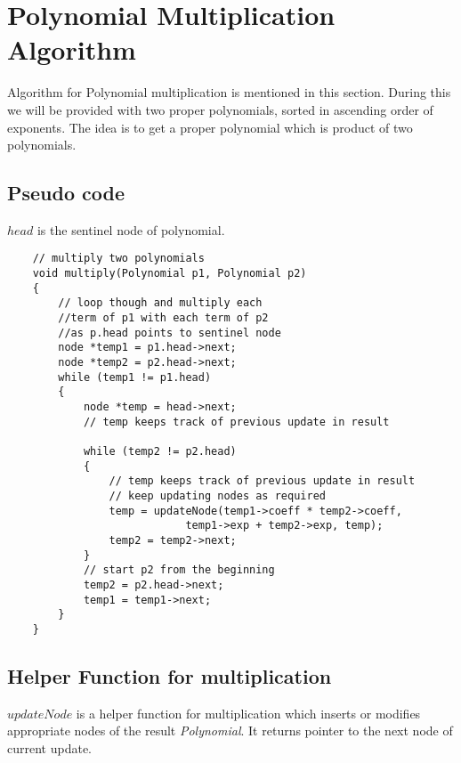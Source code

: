 \section{Polynomial Multiplication Algorithm}
\justifying
Algorithm for Polynomial multiplication is mentioned in this section. During this we will be provided with two proper polynomials, sorted in ascending order of exponents.  The idea is to get a proper polynomial which is product of two polynomials.

\subsection{Pseudo code}
$head$ is the sentinel node of polynomial.

\begin{lstlisting}
    // multiply two polynomials
    void multiply(Polynomial p1, Polynomial p2)
    {
        // loop though and multiply each
        //term of p1 with each term of p2
        //as p.head points to sentinel node 
        node *temp1 = p1.head->next;
        node *temp2 = p2.head->next;
        while (temp1 != p1.head)
        {
            node *temp = head->next;
            // temp keeps track of previous update in result
            
            while (temp2 != p2.head)
            {
                // temp keeps track of previous update in result
                // keep updating nodes as required
                temp = updateNode(temp1->coeff * temp2->coeff,
                            temp1->exp + temp2->exp, temp);
                temp2 = temp2->next;
            }
            // start p2 from the beginning
            temp2 = p2.head->next;
            temp1 = temp1->next;
        }
    }
\end{lstlisting}

\subsection{Helper Function for multiplication}

$updateNode$ is a helper function for multiplication which inserts or modifies appropriate nodes of the result \textit{Polynomial}. It returns pointer to the next node of current update.

